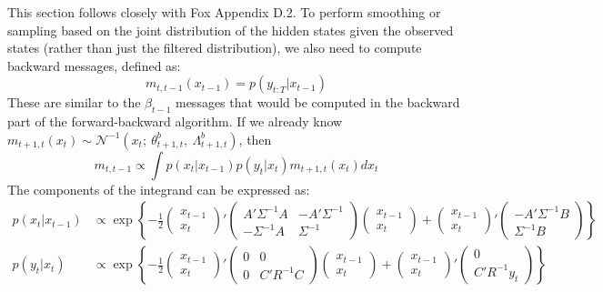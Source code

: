 \documentclass[12pt]{article}
\begin{document}
This section follows closely with Fox Appendix D.2. To perform smoothing or sampling based on the joint distribution of the hidden states given the observed states (rather than just the filtered distribution), we also need to compute backward messages, defined as:
\[m_{t,t-1}(x_{t-1}) = p(y_{t:T}|x_{t-1})\]
These are similar to the $\beta_{t-1}$ messages that would be computed in the backward part of the forward-backward algorithm. If we already know $m_{t+1,t}(x_t)\sim\mathcal{N}^{-1}(x_t;~\theta^b_{t+1,t},~\Lambda^b_{t+1,t})$, then
\[m_{t,t-1} \propto \int p(x_t|x_{t-1})p(y_t|x_t)m_{t+1,t}(x_t)dx_t\]
The components of the integrand can be expressed as:
\begin{align*}
p(x_t|x_{t-1})&\propto\exp\left\{-\frac{1}{2}\begin{pmatrix}x_{t-1}\\x_t\end{pmatrix}'\begin{pmatrix}A'\Sigma^{-1}A & -A'\Sigma^{-1}\\-\Sigma^{-1}A & \Sigma^{-1}\end{pmatrix}\begin{pmatrix}x_{t-1}\\x_t\end{pmatrix} + \begin{pmatrix}x_{t-1}\\x_t\end{pmatrix}'\begin{pmatrix}-A'\Sigma^{-1}B\\ \Sigma^{-1}B\end{pmatrix}\right\}\\
p(y_t|x_t)&\propto\exp\left\{-\frac{1}{2}\begin{pmatrix}x_{t-1}\\x_t\end{pmatrix}'\begin{pmatrix}0 & 0\\0 & C'R^{-1}C\end{pmatrix}\begin{pmatrix}x_{t-1}\\x_t\end{pmatrix} + \begin{pmatrix}x_{t-1}\\x_t\end{pmatrix}'\begin{pmatrix}0\\ C'R^{-1}y_t\end{pmatrix}\right\}\\

\end{align*}
\end{document}
